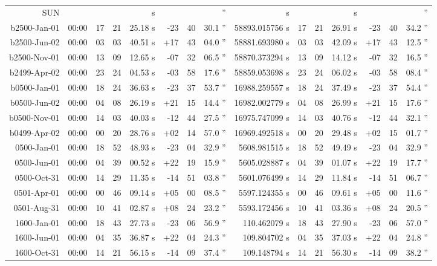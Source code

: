\begin{longtable}{r@{\,}r|r@{h}r@{m}r<{s}|r@{°}r@{'}r<{''}|r<{s}||r@{h}r@{m}r<{s}|r@{°}r@{'}r<{''}}
SUN\\
b2500-Jan-01 &00:00   &  17 & 21 & 25.18 & -23 & 40 & 30.1  & 58893.015756 & 17&21&26.91 & -23&40&34.2 \\ %
b2500-Jun-02 &00:00   &  03 & 03 & 40.51 & +17 & 43 & 04.0  & 58881.693980 & 03&03&42.09 & +17&43&12.5 \\ %
b2500-Nov-01 &00:00   &  13 & 09 & 12.65 & -07 & 32 & 06.5  & 58870.373294 & 13&09&14.12 & -07&32&16.5 \\ %
b2499-Apr-02 &00:00   &  23 & 24 & 04.53 & -03 & 58 & 17.6  & 58859.053698 & 23&24&06.02 & -03&58&08.4 \\ %
b0500-Jan-01 &00:00   &  18 & 24 & 36.63 & -23 & 37 & 53.7  & 16988.259557 & 18&24&37.49 & -23&37&54.4 \\ %
b0500-Jun-02 &00:00   &  04 & 08 & 26.19 & +21 & 15 & 14.4  & 16982.002779 & 04&08&26.99 & +21&15&17.6 \\ %
b0500-Nov-01 &00:00   &  14 & 03 & 40.03 & -12 & 44 & 27.5  & 16975.747099 & 14&03&40.76 & -12&44&32.1 \\ %
b0499-Apr-02 &00:00   &  00 & 20 & 28.76 & +02 & 14 & 57.0  & 16969.492518 & 00&20&29.48 & +02&15&01.7 \\ %
 0500-Jan-01 &00:00   &  18 & 52 & 48.93 & -23 & 04 & 32.9  &  5608.981515 & 18&52&49.49 & -23&04&32.9 \\ %
 0500-Jun-01 &00:00   &  04 & 39 & 00.52 & +22 & 19 & 15.9  &  5605.028887 & 04&39&01.07 & +22&19&17.7 \\ %
 0500-Oct-31 &00:00   &  14 & 29 & 11.35 & -14 & 51 & 03.8  &  5601.076499 & 14&29&11.84 & -14&51&06.7 \\ %
 0501-Apr-01 &00:00   &  00 & 46 & 09.14 & +05 & 00 & 08.5  &  5597.124355 & 00&46&09.61 & +05&00&11.6 \\ %
 0501-Aug-31 &00:00   &  10 & 41 & 02.87 & +08 & 24 & 23.2  &  5593.172456 & 10&41&03.36 & +08&24&20.5 \\ %
 1600-Jan-01 &00:00   &  18 & 43 & 27.73 & -23 & 06 & 56.9  &   110.462079 & 18&43&27.90 & -23&06&57.0 \\ %
 1600-Jun-01 &00:00   &  04 & 35 & 36.87 & +22 & 04 & 24.3  &   109.804702 & 04&35&37.03 & +22&04&24.8 \\ %
 1600-Oct-31 &00:00   &  14 & 21 & 56.15 & -14 & 09 & 37.4  &   109.148794 & 14&21&56.30 & -14&09&38.2 \\ %

\end{longtable}
